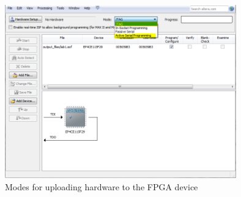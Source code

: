 \begin{figure}[H]
	\centering
	\includegraphics[width=100mm]{Lab1/figures/uploadmethod.png}
	\caption{Modes for uploading hardware to the FPGA device}
	\label{fig:uploadmethod}
\end{figure}

